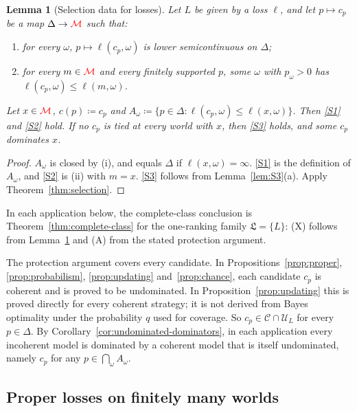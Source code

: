 \documentclass[11pt]{article}
\newcommand{\chg}[1]{{\color{red}#1}}
\newtheorem{lemma}[theorem]{Lemma}
\theoremstyle{definition}
\theoremstyle{remark}
\newcommand{\M}{\mathcal M}
\newcommand{\C}{\mathcal C}
\newcommand{\U}{\mathcal U}
\newcommand{\Lf}{\mathfrak L}
\begin{document}
\begin{lemma}[Selection data for losses]\label{lem:loss-one-stage}
Let $L$ be given by a loss $\ell$, and let $p\mapsto c_p$ be a map $\Delta\to\chg{\M}$ such that:
\begin{enumerate}[label=(\roman*)]
\item for every $\omega$, $p\mapsto\ell(c_p,\omega)$ is lower semicontinuous on $\Delta$;
\item for every $m\in\chg{\M}$ and every finitely supported $p$, some $\omega$ with $p_\omega>0$ has $\ell(c_p,\omega)\le\ell(m,\omega)$.
\end{enumerate}
Let $x\in\chg{\M}$, $c(p)\coloneqq c_p$ and $A_\omega\coloneqq\{p\in\Delta:\ell(c_p,\omega)\le\ell(x,\omega)\}$. Then \ref{S1} and \ref{S2} hold. If no $c_p$ is tied at every world with $x$, then \ref{S3} holds, and some $c_p$ dominates $x$.
\end{lemma}
\begin{proof}
$A_\omega$ is closed by (i), and equals $\Delta$ if $\ell(x,\omega)=\infty$. \ref{S1} is the definition of $A_\omega$, and \ref{S2} is (ii) with $m=x$. \ref{S3} follows from Lemma~\ref{lem:S3}(a). Apply Theorem~\ref{thm:selection}.
\end{proof}

In each application below, the complete-class conclusion is Theorem~\ref{thm:complete-class} for the one-ranking family $\Lf=\{L\}$: (X) follows from Lemma~\ref{lem:loss-one-stage} and (A) from the stated protection argument.

The protection argument covers every candidate. In Propositions~\ref{prop:proper}, \ref{prop:probabilism}, \ref{prop:updating} and~\ref{prop:chance}, each candidate $c_p$ is coherent and is proved to be undominated. In Proposition~\ref{prop:updating} this is proved directly for every coherent strategy; it is not derived from Bayes optimality under the probability $q$ used for coverage. So $c_p\in\C\cap\U_L$ for every $p\in\Delta$. By Corollary~\ref{cor:undominated-dominators}, in each application every incoherent model is dominated by a coherent model that is itself undominated, namely $c_p$ for any $p\in\bigcap_\omega A_\omega$.

\subsection{Proper losses on finitely many worlds}
\end{document}
